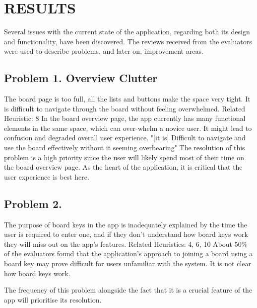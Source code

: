 \section{RESULTS}
\indent Several issues with the current state of the application, regarding both its design and functionality, have been discovered. The reviews received from the evaluators were used to describe problems, and later on, improvement areas.
\newline

\subsection*{Problem 1. Overview Clutter}
The board page is too full, all the lists and buttons make the space very tight. It is difficult to navigate through the board without feeling overwhelmed.
\newline
Related Heuristic: 8
\newline
\indent In the board overview page, the app currently has many functional elements in the same space, which can over-whelm a novice user. It might lead to confusion and degraded overall user experience.
\newline
"[it is] Difficult to navigate and use the board effectively without it seeming overbearing"\cite{team-review}
\newline
\indent The resolution of this problem is a high priority since the user will likely spend most of their time on the board overview page. As the heart of the application, it is critical that the user experience is best here.
\newline

\subsection*{Problem 2.}
The purpose of board keys in the app is inadequately explained by the time the user is required to enter one, and if they don’t understand how board keys work they will miss out on the app’s features.
\newline
Related Heuristics: 4, 6, 10
\newline
\indent About 50\% of the evaluators found that the application’s approach to joining a board using a board key may prove difficult for users unfamiliar with the system. It is not clear how board keys work.
 
\indent The frequency of this problem alongside the fact that it is a crucial feature of the app will prioritise its resolution.
\newline

